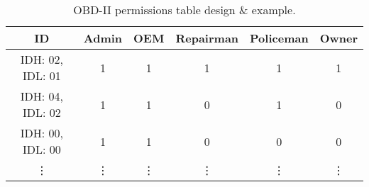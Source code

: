 \begin{table}[]
	\centering
	\begin{tabular}{|c|c|c|c|c|c|}
		\hline
		\rowcolor[HTML]{9B9B9B} ID & Admin & OEM & Repairman & Policeman & Owner \\ \hline
		\cellcolor[HTML]{9B9B9B} IDH: 02, IDL: 01 & 1 & 1 & 1 & 1 & 1 \\ \hline
		\cellcolor[HTML]{9B9B9B} IDH: 04, IDL: 02 & 1 & 1 & 0 & 1 & 0 \\ \hline
		\cellcolor[HTML]{9B9B9B} IDH: 00, IDL: 00 & 1 & 1 & 0 & 0 & 0 \\ \hline
		\cellcolor[HTML]{9B9B9B} \vdots & \vdots & \vdots & \vdots & \vdots & \vdots
	\end{tabular}
	\caption{OBD-II permissions table design \& example.}
	\label{table:2}
\end{table}

